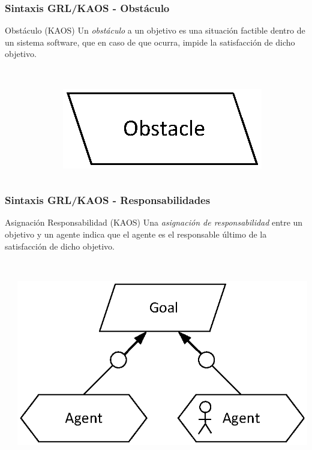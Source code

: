 \documentclass[slidestop,xcolor=pst,dvips,blue]{beamer}
\begin{document}
\begin{frame}[c]
    \frametitle{Sintaxis GRL/KAOS - Obstáculo}
    \begin{block}{Obstáculo (KAOS)}
        Un \alert{\emph{obstáculo}}  a un objetivo es una situación factible dentro de un sistema software, que en caso de que ocurra, impide la satisfacción de dicho objetivo.
        \ \\
        \ \\
        \begin{columns}[c]
            \begin{column}{0.50\linewidth}
            \end{column}
            \begin{column}{0.50\linewidth}
                \centering \includegraphics[width=0.50\columnwidth,keepaspectratio=true]{images/objetivos/obstacle(KAOS).eps}
            \end{column}
        \end{columns}
     \end{block}
\end{frame}

\begin{frame}[c]
    \frametitle{Sintaxis GRL/KAOS - Responsabilidades}
    \begin{block}{Asignación Responsabilidad (KAOS)}
        Una \alert{\emph{asignación de responsabilidad}} entre un objetivo y un agente indica que el agente es el responsable último de la satisfacción de dicho objetivo.
        \ \\
        \ \\
        \begin{columns}[c]
            \begin{column}{0.50\linewidth}
            \end{column}
            \begin{column}{0.50\linewidth}
                \centering \includegraphics[width=0.65\columnwidth,keepaspectratio=true]{images/objetivos/responsabilityAsig(KAOS).eps}
            \end{column}
        \end{columns}
    \end{block}
\end{frame}
\end{document}
